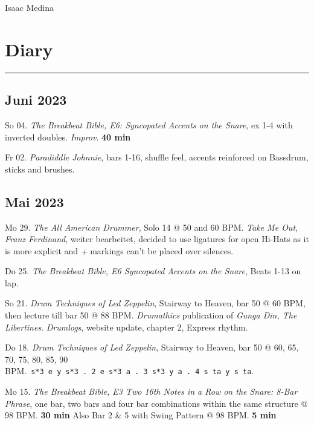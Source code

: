 \documentclass[
]{book}
\begin{document}
Isaac Medina

\hypertarget{Diary}{%
\chapter{Diary}\label{Diary}}

\begin{center}\rule{0.5\linewidth}{0.5pt}\end{center}

\hypertarget{juni-2023}{%
\section*{Juni 2023}\label{juni-2023}}

So 04. \emph{The Breakbeat Bible, E6: Syncopated Accents on the Snare}, ex 1-4 with inverted doubles. \emph{Improv}. \textbf{40 min}

Fr 02. \emph{Paradiddle Johnnie}, bars 1-16, shuffle feel, accents reinforced on Bassdrum, sticks and brushes.

\hypertarget{mai-2023}{%
\section*{Mai 2023}\label{mai-2023}}

Mo 29. \emph{The All American Drummer}, Solo 14 @ 50 and 60 BPM. \emph{Take Me Out, Franz Ferdinand}, weiter bearbeitet, decided to use ligatures for open Hi-Hats as it is more explicit and \emph{+} markings can't be placed over silences.

Do 25. \emph{The Breakbeat Bible, E6 Syncopated Accents on the Snare}, Beats 1-13 on lap.

So 21. \emph{Drum Techniques of Led Zeppelin}, Stairway to Heaven, bar 50 @ 60 BPM, then lecture till bar 50 @ 88 BPM. \emph{Drumathics} publication of \emph{Gunga Din, The Libertines}. \emph{Drumlogs}, website update, chapter 2, Express rhythm.

Do 18. \emph{Drum Techniques of Led Zeppelin}, Stairway to Heaven, bar 50 @ 60, 65, 70, 75, 80, 85, 90 BPM.~\texttt{s*3\ e\ y\ s*3\ .\ 2\ e\ s*3\ a\ .\ 3\ s*3\ y\ a\ .\ 4\ s\ ta\ y\ s\ ta}.

Mo 15. \emph{The Breakbeat Bible, E3 Two 16th Notes in a Row on the Snare: 8-Bar Phrase}, one bar, two bars and four bar combinations within the same structure @ 98 BPM. \textbf{30 min} Also Bar 2 \& 5 with Swing Pattern @ 98 BPM. \textbf{5 min}
\end{document}
